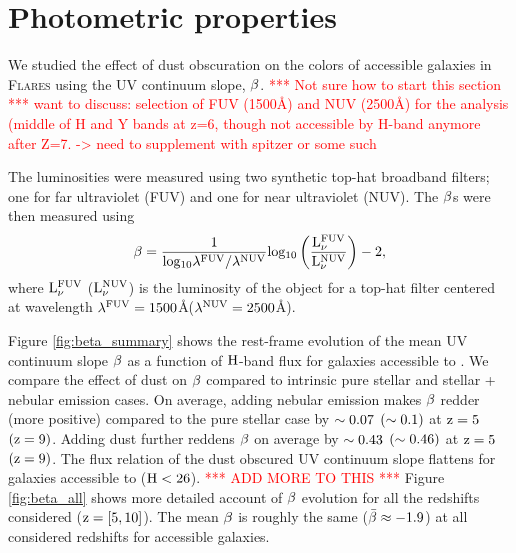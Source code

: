 
\section{Photometric properties}\label{sec:phot}

We studied the effect of dust obscuration on the colors of \euclid accessible galaxies in \textsc{Flares} using the UV continuum slope, $\rm \beta$.  \textcolor{red}{*** Not sure how to start this section *** want to discuss: selection of FUV (1500Å) and NUV (2500Å) for the analysis (middle of H and Y bands at z=6, though not accessible by H-band anymore after Z=7. -> need to supplement with spitzer or some such}

The luminosities were measured using two synthetic top-hat broadband filters; one for far ultraviolet (FUV) and one for near ultraviolet (NUV). The $\rm \beta$s were then measured using
\begin{equation}
\centering
    \mathrm{\beta = \frac{1}{log_{10}{\lambda^{FUV} / \lambda^{NUV}}} log_{10} \left ( \frac{L_{\nu}^{FUV}}{L_{\nu}^{NUV}} \right )  - 2  },
    \label{eqn:beta}
\end{equation}
\noindent
where $\rm L_{\nu}^{FUV}$ ($\rm L_{\nu}^{NUV}$) is the luminosity of the object for a top-hat filter centered at wavelength $\rm \lambda^{FUV} = 1500 $\AA  ($\rm \lambda^{NUV} = 2500 $\AA).

Figure \ref{fig:beta_summary} shows the rest-frame evolution of the mean UV continuum slope $\rm \beta$ as a function of $\rm H$-band flux for galaxies accessible to \euclid. We compare the effect of dust on $\rm \beta$ compared to intrinsic pure stellar and stellar + nebular emission cases. On average, adding nebular emission makes $\rm \beta$ redder (more positive) compared to the pure stellar case by $\rm \sim 0.07$ $(\rm \sim 0.1)$ at $\rm z=5$ $(\rm z=9)$. Adding dust further reddens $\rm \beta$ on average by $\rm \sim0.43$ $(\rm \sim0.46)$ at $\rm z=5$ $(\rm z=9)$. The flux relation of the dust obscured UV continuum slope flattens for galaxies accessible to \euclid \: ($\rm H < 26$). \textcolor{red}{*** ADD MORE TO THIS ***} Figure \ref{fig:beta_all} shows more detailed account of $\rm \beta$ evolution for all the redshifts considered ($\rm z = [5, 10]$). The mean $\rm \beta$ is roughly the same ($\rm \Bar{\beta} \approx -1.9 $) at all considered redshifts for \euclid \: accessible galaxies.


